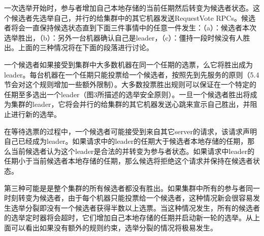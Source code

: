 \documentclass[journal]{IEEEtran}
\begin{document}
一次选举开始时，参与者增加自己本地存储的当前任期然后转变为候选者状态。这个候选者先选举自己，并行的给集群中的其它机器发送RequestVote RPCs。候选者将会一直保持候选状态直到下面三件事情中的任意一件发生：（a）：候选者本次选举胜出，（b）：另外一台机器确认自己是leader，（c）：僵持一段时候没有人胜出。上面的三种情况将在下面的段落进行讨论。


一个候选者如果接受到集群中大多数机器在同一个任期的选票，么它将胜出成为leader。每台机器在一个任期只能投票给一个候选者，按照先到先服务的原则（5.4节会对这个规则增加一些额外限制）。大多数投票胜出规则可以保证在一个特定的任期至多选出一个leader（图3所描述的选举安全原则）。一旦一个候选者胜出将成为集群的leader，它将会并行的给集群的其它机器发送心跳来宣示自己胜出，并阻止进行新的选举。


在等待选票的过程中，一个候选者可能接受到来自其它server的请求，该请求声明自己已经成为leader。如果请求中的leader的任期大于候选者本地存储的任期，那么当前候选者认为这个leader是合法的并转变为参与者状态。如果请求中leader的任期小于当前候选者本地存储的任期，那么候选将拒绝这个请求并保持在候选者状态。


第三种可能是是整个集群的所有候选者都没有胜出。如果集群中所有的参与者同一时刻转变为候选者，由于每个机器只能投票给一个候选者，这种情况新会很容易发生选举分裂即没有一个候选者获得半数以上选票。当这种情况发生，所有的候选者的选举定时器将会超时，它们增加自己本地存储的任期并启动新一轮的选举。从上面可以看出如果没有额外的规则约束，选举分裂的情况将极易发生。
\end{document}
